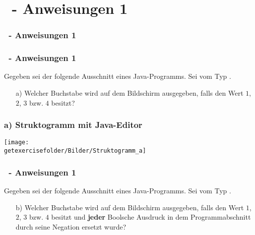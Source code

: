 \def\stitle{\theexercise\ - Anweisungen 1}
\section{\stitle}
\begin{frame}
    \frametitle{\stitle}
\tableofcontents[current]    
\end{frame}

\begin{frame}[t]%
    \frametitle{\stitle}

Gegeben sei der folgende Ausschnitt eines Java-Programms. Sei  vom Typ .



\begin{itemize}
\item[a)] Welcher Buchstabe wird auf dem Bildschirm ausgegeben, falls  den Wert $1$, $2$, $3$ bzw. $4$ besitzt?
\end{itemize}
\end{frame}


\begin{frame}[fragile]%
 \frametitle{a) Struktogramm mit Java-Editor}%

\begin{center}

\texttt{[image: \\getexercisefolder/Bilder/Struktogramm\_a]}
\end{center}

\end{frame}

\begin{frame}[t]%
    \frametitle{\stitle}

Gegeben sei der folgende Ausschnitt eines Java-Programms. Sei  vom Typ .



\begin{itemize}
\item[b)] Welcher Buchstabe wird auf dem Bildschirm ausgegeben, falls  den Wert $1$, $2$, $3$ bzw. $4$ besitzt und \textbf{jeder} Boolsche Ausdruck in dem Programmabschnitt durch seine Negation ersetzt wurde?
\end{itemize}
\end{frame}

